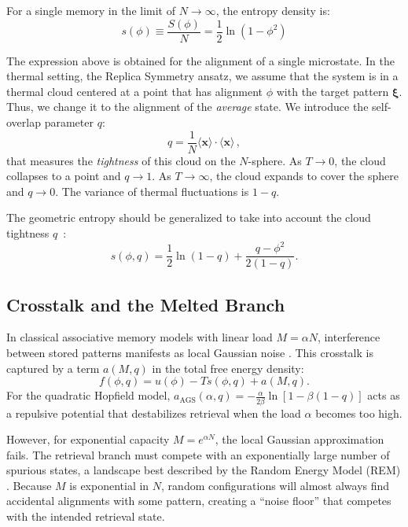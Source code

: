 \documentclass{article}
\theoremstyle{plain}
\theoremstyle{definition}
\theoremstyle{remark}
\begin{document}
For a single memory in the limit of $N\to \infty$, the entropy density is:
\begin{equation}
    s(\phi) \equiv \frac{S(\phi)}N = \frac12 \ln ( 1 - \phi^2 )
\end{equation}

The expression above is obtained for the alignment of a single microstate. In the thermal setting, the Replica Symmetry ansatz,  we assume that the system is in a thermal cloud centered at a point that has alignment $\phi$ with the target pattern $\bm{\xi}$. Thus, we change it to the alignment of the \textit{average} state.  We introduce the self-overlap parameter $q$:
\begin{equation}
    q = \frac{1}{N} \langle \bm{x} \rangle \cdot \langle \bm{x} \rangle\,,
\end{equation}
that measures the \textit{tightness} of this cloud on the $N$-sphere. As $T \to 0$, the cloud collapses to a point and $q \to 1$. As $T \to \infty$, the cloud expands to cover the sphere and $q \to 0$. The variance of thermal fluctuations is $1-q$.

The geometric entropy should be generalized to take into account the cloud tightness $q$~\cite{gardner1988space}:
\begin{equation}
    s(\phi, q) = \frac{1}{2} \ln(1-q) + \frac{q - \phi^2}{2(1-q)}.
\end{equation}

\subsection{Crosstalk and the Melted Branch}

In classical associative memory models with linear load $M = \alpha N$, interference between stored patterns manifests as local Gaussian noise \cite{amit1987statistical}. This crosstalk is captured by a term $a(M, q)$ in the total free energy density:
\begin{equation}
    f(\phi, q) = u(\phi) - T s(\phi, q) + a(M, q).
    \label{eq:total_free_energy}
\end{equation}
For the quadratic Hopfield model, $a_{\text{AGS}}(\alpha, q) = -\frac{\alpha}{2\beta} \ln [1 - \beta(1 - q)]$ acts as a repulsive potential that destabilizes retrieval when the load $\alpha$ becomes too high.

However, for exponential capacity $M = e^{\alpha N}$, the local Gaussian approximation fails. The retrieval branch must compete with an exponentially large number of spurious states, a landscape best described by the Random Energy Model (REM) \cite{derrida1980random}. Because $M$ is exponential in $N$, random configurations will almost always find accidental alignments with some pattern, creating a ``noise floor'' that competes with the intended retrieval state.
\end{document}
